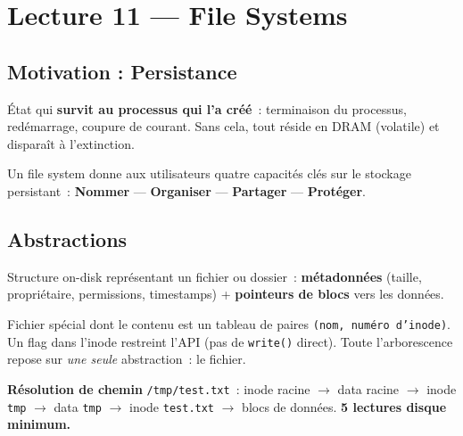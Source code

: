 \documentclass[11pt,a4paper,openany]{book}
\begin{document}
\raggedbottom


\tableofcontents
\clearpage


\chapter{Lecture 11 --- File Systems}

\section{Motivation : Persistance}

\begin{defnbox}[title={Persistance}]
État qui \textbf{survit au processus qui l'a créé}~: terminaison du processus, redémarrage, coupure de courant. Sans cela, tout réside en DRAM (volatile) et disparaît à l'extinction.
\end{defnbox}

Un file system donne aux utilisateurs quatre capacités clés sur le stockage persistant~:
\textbf{Nommer} — \textbf{Organiser} — \textbf{Partager} — \textbf{Protéger}.

\section{Abstractions}

\begin{defnbox}[title={Inode}]
Structure on-disk représentant un fichier ou dossier~: \textbf{métadonnées} (taille, propriétaire, permissions, timestamps) + \textbf{pointeurs de blocs} vers les données.
\end{defnbox}

\begin{defnbox}[title={Répertoire}]
Fichier spécial dont le contenu est un tableau de paires \texttt{(nom, numéro d'inode)}. Un flag dans l'inode restreint l'API (pas de \texttt{write()} direct). Toute l'arborescence repose sur \emph{une seule} abstraction~: le fichier.
\end{defnbox}

\begin{keybox}
\textbf{Résolution de chemin} \texttt{/tmp/test.txt}~: inode racine $\to$ data racine $\to$ inode \texttt{tmp} $\to$ data \texttt{tmp} $\to$ inode \texttt{test.txt} $\to$ blocs de données. \textbf{5 lectures disque minimum.}
\end{keybox}
\end{document}
